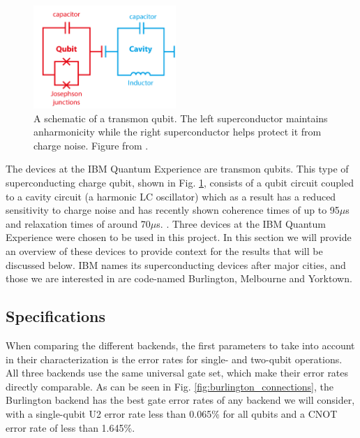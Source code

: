 \begin{figure}[h] \centering
\includegraphics[width=0.48\textwidth]{images/transmon_diagram.png}
  \caption{A schematic of a transmon qubit. The left superconductor maintains
anharmonicity while the right superconductor helps protect it from charge noise.
Figure from \cite{dickel20_how_to_make_artif_atoms}.}
  \label{fig:transmon}
\end{figure}

The devices at the IBM Quantum Experience are transmon qubits. This type of
superconducting charge qubit, shown in Fig. \ref{fig:transmon}, consists of a
qubit circuit coupled to a cavity circuit (a harmonic LC oscillator) which as a
result has a reduced sensitivity to charge noise and has recently shown
coherence times of up to 95$\mu$s and relaxation times of around 70$\mu$s.
\cite{koch07_charg_insen_qubit_desig_deriv,rigetti12_super_qubit_waveg_cavit_with}. Three devices at the IBM Quantum
Experience were chosen to be used in this project. In this section we will
provide an overview of these devices to provide context for the results that
will be discussed below. IBM names its superconducting devices after major
cities, and those we are interested in are code-named Burlington, Melbourne and
Yorktown.

\subsection{Specifications}\label{Specifications} When comparing the different backends, the first
parameters to take into account in their characterization is the error rates for
single- and two-qubit operations. All three backends use the same universal gate
set, which make their error rates directly comparable. As can be seen in Fig.
\ref{fig:burlington_connections}, the Burlington backend has the best gate error rates of
any backend we will consider, with a single-qubit U2 error rate less than
0.065\% for all qubits and a CNOT error rate of less than 1.645\%.

